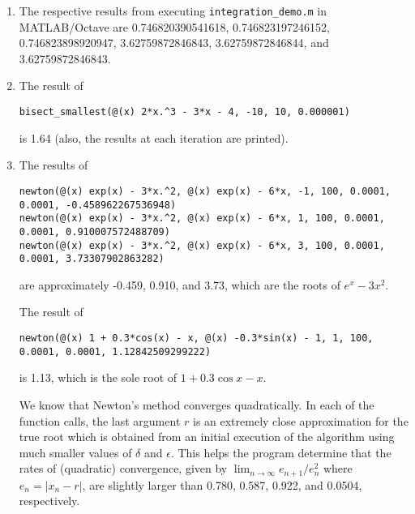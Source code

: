 \documentclass[a4paper,12pt]{article}
\begin{document}
\begin{enumerate}
    \item
        The respective results from executing \texttt{integration\_demo.m} in MATLAB/Octave are 0.746820390541618, 0.746823197246152, 0.746823898920947, 3.62759872846843, 3.62759872846844, and 3.62759872846843.

    \item
        The result of
        \begin{center}
            \texttt{bisect\_smallest(@(x) 2*x.\^{}3 - 3*x - 4, -10, 10, 0.000001)}
        \end{center}
        is 1.64 (also, the results at each iteration are printed).

    \item
        The results of
        \begin{center}
            \texttt{newton(@(x) exp(x) - 3*x.\^{}2, @(x) exp(x) - 6*x, -1, 100, 0.0001, 0.0001, -0.458962267536948)} \\
            \texttt{newton(@(x) exp(x) - 3*x.\^{}2, @(x) exp(x) - 6*x, 1, 100, 0.0001, 0.0001, 0.910007572488709)} \\
            \texttt{newton(@(x) exp(x) - 3*x.\^{}2, @(x) exp(x) - 6*x, 3, 100, 0.0001, 0.0001, 3.73307902863282)}
        \end{center}
        are approximately -0.459, 0.910, and 3.73, which are the roots of $e^x - 3x^2$. \par
        The result of 
        \begin{center}
            \texttt{newton(@(x) 1 + 0.3*cos(x) - x, @(x) -0.3*sin(x) - 1, 1, 100, 0.0001, 0.0001, 1.12842509299222)}
        \end{center}
        is 1.13, which is the sole root of $1 + 0.3\cos x - x$. \par
        We know that Newton's method converges quadratically. In each of the function calls, the last argument $r$ is an extremely close approximation for the true root which is obtained from an initial execution of the algorithm using much smaller values of $\delta$ and $\epsilon$. This helps the program determine that the rates of (quadratic) convergence, given by $\lim_{n \to \infty} e_{n + 1} / e_n^2$ where $e_n = |x_n - r|$, are slightly larger than 0.780, 0.587, 0.922, and 0.0504, respectively.
\end{enumerate}
\end{document}
